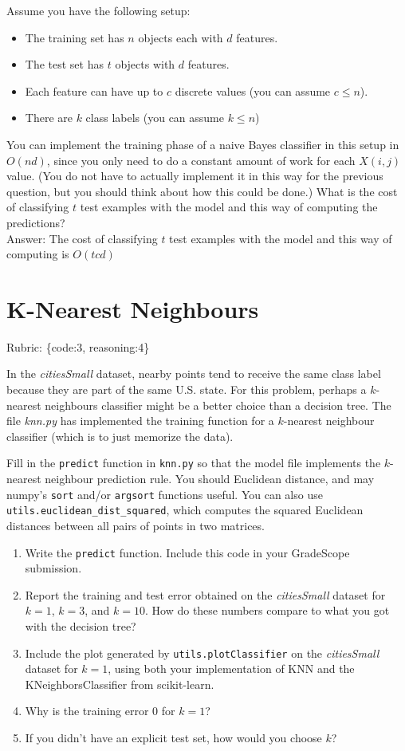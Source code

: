 \documentclass{article}
\def\rubric#1{\gre{Rubric: \{#1\}}}{}
\def\blu#1{{\color{blu}#1}}
\def\gre#1{{\color{gre}#1}}
\def\items#1{\begin{itemize}#1\end{itemize}}
\def\enum#1{\begin{enumerate}#1\end{enumerate}}
\def\ans#1{\gre{Answer: #1}}{}
\begin{document}
Assume you have the following setup:
\items{
\item The training set has $n$ objects each with $d$ features.
\item The test set has $t$ objects with $d$ features.
\item Each feature can have up to $c$ discrete values (you can assume $c \leq n$).
\item There are $k$ class labels (you can assume $k \leq n$)
}
You can implement the training phase of a naive Bayes classifier in this setup in $O(nd)$, since you only need to do a constant amount of work for each $X(i,j)$ value. (You do not have to actually implement it in this way for the previous question, but you should think about how this could be done.)
 \blu{What is the cost of classifying $t$ test examples with the model and this way of computing the predictions?} \\
 \ans{The cost of classifying $t$ test examples with the model and this way of computing is $O(t c d)$}


\section{K-Nearest Neighbours}
\rubric{code:3, reasoning:4}

In the \emph{citiesSmall} dataset, nearby points tend to receive the same class label because they are part of the same U.S. state. For this problem, perhaps a $k$-nearest neighbours classifier might be a better choice than a decision tree. The file \emph{knn.py} has implemented the training function for a $k$-nearest neighbour classifier (which is to just memorize the data).


Fill in the \texttt{predict} function in \texttt{knn.py} so that the model file implements the $k$-nearest neighbour prediction rule.
You should Euclidean distance, and may numpy's \texttt{sort} and/or \texttt{argsort} functions useful.
You can also use \texttt{utils.euclidean\string_dist\string_squared}, which computes the squared Euclidean distances between all pairs of points in two matrices.
\blu{
\enum{
\item Write the \texttt{predict} function. Include this code in your GradeScope submission.
\item Report  the training and test error obtained on the \emph{citiesSmall} dataset for $k=1$, $k=3$, and $k=10$. How do these numbers compare to what you got with the decision tree?
\item Include the plot generated by \texttt{utils.plotClassifier} on the \emph{citiesSmall} dataset for $k=1$, using both your implementation of KNN and the KNeighborsClassifier from scikit-learn.
\item Why is the training error $0$ for $k=1$?
\item If you didn't have an explicit test set, how would you choose $k$?
}}
\end{document}
